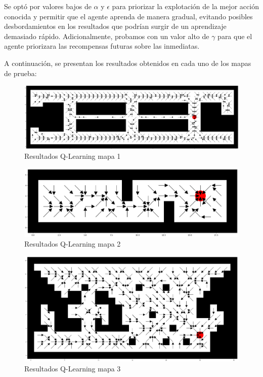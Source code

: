 \documentclass[conference,a4paper]{IEEEtran}
\begin{document}
Se optó por valores bajos de $\alpha$ y $\epsilon$ para priorizar la explotación de la mejor acción conocida y permitir que el agente aprenda de manera gradual, evitando posibles desbordamientos en los resultados que podrían surgir de un aprendizaje demasiado rápido.
Adicionalmente, probamos con un valor alto de $\gamma$ para que el agente priorizara las recompensas futuras sobre las inmediatas.\newline

A continuación, se presentan los resultados obtenidos en cada uno de los mapas de prueba:

\begin{figure}[h]
  \centering
  \includegraphics[scale=0.33]{resultado_qlearning_mapa_1}
  \caption{Resultados Q-Learning mapa 1}
  \label{fig:resultado_qlearning_mapa_1}
\end{figure}

\begin{figure}[h]
  \centering
  \includegraphics[scale=0.33]{resultado_qlearning_mapa_2}
  \caption{Resultados Q-Learning mapa 2}
  \label{fig:resultado_qlearning_mapa_2}
\end{figure}

\begin{figure}[h]
  \centering
  \includegraphics[scale=0.25]{resultado_qlearning_mapa_3}
  \caption{Resultados Q-Learning mapa 3}
  \label{fig:resultado_qlearning_mapa_3}
\end{figure}
\end{document}

